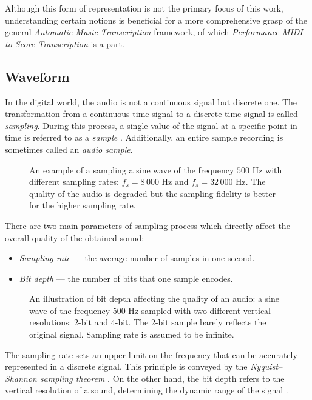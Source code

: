 Although this form of representation is not the primary focus of this work, understanding certain notions is beneficial for a more comprehensive grasp of the general \emph{Automatic Music Transcription} framework, of which \emph{Performance MIDI to Score Transcription} is a part.

\subsection{Waveform}

In the digital world, the audio is not a continuous signal but discrete one. The transformation from a continuous-time signal to a discrete-time signal is called \emph{sampling}. During this process, a single value of the signal at a specific point in time is referred to as a \emph{sample} \cite[p.~34--35]{Smith1999}. Additionally, an entire sample recording is sometimes called an \emph{audio sample}.

\begin{figure}[ht!]
\centering

\caption[An example of a sampling a sine wave with different sampling rates.]{An example of a sampling a sine wave of the frequency $500$ Hz with different sampling rates: $f_s = 8\,000$ Hz and $f_s = 32\,000$ Hz. The quality of the audio is degraded but the sampling fidelity is better for the higher sampling rate.}
\end{figure}

There are two main parameters of sampling process which directly affect the overall quality of the obtained sound:
\begin{itemize}
   \item \emph{Sampling rate} --- the average number of samples in one second.
   \item \emph{Bit depth} --- the number of bits that one sample encodes.
\end{itemize}

\begin{figure}[ht!]
\centering

\caption[An illustration of bit depth affecting the quality of an audio.]{An illustration of bit depth affecting the quality of an audio: a sine wave of the frequency $500$ Hz sampled with two different vertical resolutions: $2$-bit and $4$-bit. The $2$-bit sample barely reflects the original signal. Sampling rate is assumed to be infinite.}
\end{figure}

The sampling rate sets an upper limit on the frequency that can be accurately represented in a discrete signal. This principle is conveyed by the \emph{Nyquist–Shannon sampling theorem} \cite[p.~40]{Smith1999}. On the other hand, the bit depth refers to the vertical resolution of a sound, determining the dynamic range of the signal \cite[p.~36]{Smith1999}.

